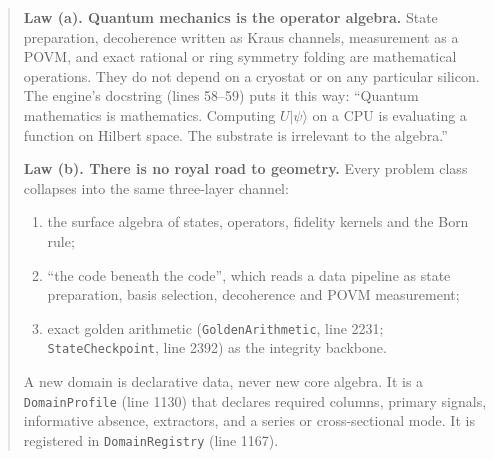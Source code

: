 \documentclass[11pt]{article}
\theoremstyle{definition}
\newcommand{\code}[1]{\texttt{\small #1}}
\begin{document}
\begin{quote}
\textbf{Law (a). Quantum mechanics is the operator algebra.} State preparation, decoherence written as Kraus
channels, measurement as a POVM, and exact rational or ring symmetry folding are mathematical operations. They do
not depend on a cryostat or on any particular silicon. The engine's docstring (lines 58--59) puts it this way:
``Quantum mathematics is mathematics. Computing $U|\psi\rangle$ on a CPU is evaluating a function on Hilbert
space. The substrate is irrelevant to the algebra.''

\textbf{Law (b). There is no royal road to geometry.} Every problem class collapses into the same three-layer
channel:
\begin{enumerate}
\item the surface algebra of states, operators, fidelity kernels and the Born rule;
\item ``the code beneath the code'', which reads a data pipeline as state preparation, basis selection,
decoherence and POVM measurement;
\item exact golden arithmetic (\code{GoldenArithmetic}, line 2231; \code{StateCheckpoint}, line 2392) as the
integrity backbone.
\end{enumerate}
A new domain is declarative data, never new core algebra. It is a \code{DomainProfile} (line 1130) that declares
required columns, primary signals, informative absence, extractors, and a series or cross-sectional mode. It is
registered in \code{DomainRegistry} (line 1167).
\end{quote}
\end{document}

